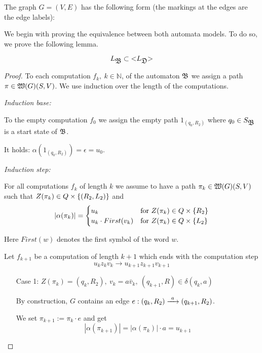 The graph $G = (V, E)$ has the following form (the markings at the edges are
the edge labels): 

\begin{center}

\end{center}

We begin with proving the equivalence between both automata models. To do so, we
prove the following lemma.

\begin{lemma}
\[ L_{\mbox{$\mathfrak{B}$}} \subset \mbox{${<}{L_{\mbox{$\mathfrak{D}$}}}{>}$} \]
\end{lemma}

\begin{proof}
To each computation $f_k,\ k \in \mathbb{N}$, of the automaton
$\mbox{$\mathfrak{B}$}$ we assign a path $\pi \in \mbox{$\mathfrak{W}({G})$}(S, V)$. We use induction over the
length of the computations.

{\em Induction base:}

To the empty computation $f_0$ we assign the empty path $1_{(q_0, R_2)}$ where
$q_0 \in S_{\mbox{$\mathfrak{B}$}}$ is a start state of $\mbox{$\mathfrak{B}$}$.

It holds: $\alpha(1_{(q_0, R_2)}) = \epsilon = u_0$.

{\em Induction step:}

For all computations $f_k$ of length $k$ we assume to have a path $\pi_k \in
\mbox{$\mathfrak{W}({G})$}(S, V)$ such that $Z(\pi_k) \in Q \times \mbox{$\{(R_2, L_2)\}$}$ and
\[ |\alpha(\pi_k)| = \begin{cases}
u_k & \text{for }Z(\pi_k) \in Q \times \mbox{$\{R_2\}$} \\
u_k \cdot First(v_k) & \text{for }Z(\pi_k) \in Q \times \mbox{$\{L_2\}$}
\end{cases} \]

Here $First(w)$ denotes the first symbol of the word $w$.

Let $f_{k+1}$ be a computation of length $k+1$ which ends with the computation
step
\[ u_k z_k v_k \to u_{k+1} z_{k+1} v_{k+1} \]

\begin{itemize}
  \item[Case 1:] $Z(\pi_k) = (q_k, R_2),\ v_k = a \bar{v}_k,\ (q_{k+1}, R) \in
  \delta(q_k, a)$
  
  By construction, $G$ contains an edge $e: (q_k, R_2) \xrightarrow{\ {a}\ } (q_{k+1}, R_2)$.
  
  We set $\pi_{k+1} := \pi_k \cdot e$ and get
  \[ |\alpha(\pi_{k+1})| = |\alpha(\pi_k)| \cdot a = u_{k+1} \]
  

\end{itemize}
\end{proof}
